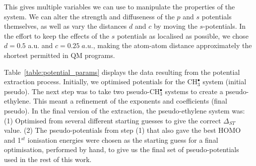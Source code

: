 \documentclass[12pt]{article}
\begin{document}
This gives multiple variables we can use to manipulate the properties of the system.
We can alter the strength and diffuseness of the \(p\) and \(s\) potentials themselves,
as well as vary the distances \(d\) and \(c\) by moving the \(s\)-potentials.
In the effort to keep the effects 
of the $s$ potentials as localised as possible, we chose $d=0.5$ a.u. and \(c = 0.25\;a.u.\), making the atom-atom distance approximately the shortest permitted in QM programs.

Table~\ref{table:potential_params} displays the data resulting from the potential extraction process. 
Initially, we optimised potentials for the CH$_3^\bullet$ system (initial pseudo).
The next step was to take two pseudo-CH\(^{\bullet}_{3}\) systems to create a pseudo-ethylene. 
This meant a refinement of the exponents and coefficients (final pseudo).
In the final version of the extraction, the pseudo-ethylene system was: (1) Optimised from several different starting guesses to give the correct $\Delta_{ST}$ value. (2) The pseudo-potentials from step (1) that also gave the best HOMO and 1$^{st}$ ionisation energies were chosen as the starting guess for a final optimisation, performed by hand, to give us the final set of pseudo-potentials used in the rest of this work.
\end{document}
